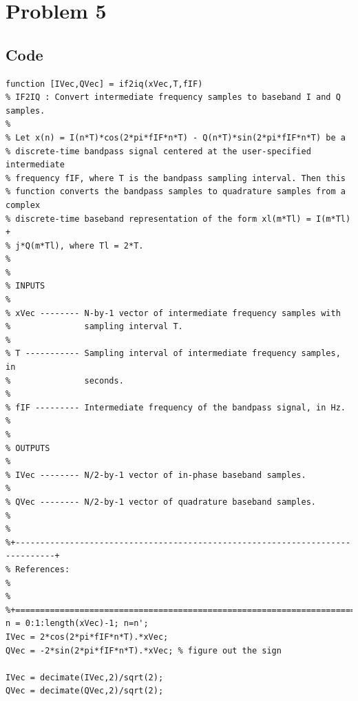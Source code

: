 \section{Problem 5}

\subsection{Code}


\begin{lstlisting}
function [IVec,QVec] = if2iq(xVec,T,fIF)
% IF2IQ : Convert intermediate frequency samples to baseband I and Q samples.
%
% Let x(n) = I(n*T)*cos(2*pi*fIF*n*T) - Q(n*T)*sin(2*pi*fIF*n*T) be a
% discrete-time bandpass signal centered at the user-specified intermediate
% frequency fIF, where T is the bandpass sampling interval. Then this
% function converts the bandpass samples to quadrature samples from a complex
% discrete-time baseband representation of the form xl(m*Tl) = I(m*Tl) +
% j*Q(m*Tl), where Tl = 2*T.
%
%
% INPUTS
%
% xVec -------- N-by-1 vector of intermediate frequency samples with
%               sampling interval T.
%
% T ----------- Sampling interval of intermediate frequency samples, in
%               seconds.
%
% fIF --------- Intermediate frequency of the bandpass signal, in Hz.
%
%
% OUTPUTS
%
% IVec -------- N/2-by-1 vector of in-phase baseband samples.
%
% QVec -------- N/2-by-1 vector of quadrature baseband samples.
%
%
%+------------------------------------------------------------------------------+
% References:
%
%
%+==============================================================================+
n = 0:1:length(xVec)-1; n=n';
IVec = 2*cos(2*pi*fIF*n*T).*xVec;
QVec = -2*sin(2*pi*fIF*n*T).*xVec; % figure out the sign

IVec = decimate(IVec,2)/sqrt(2);
QVec = decimate(QVec,2)/sqrt(2);
\end{lstlisting}


